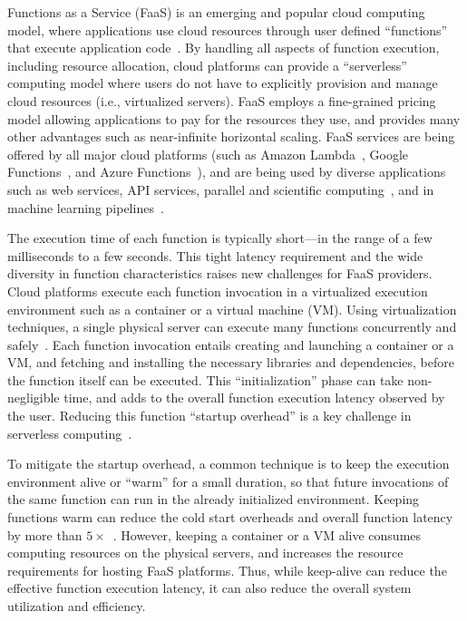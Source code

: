 
Functions as a Service (FaaS) is an emerging and popular cloud computing model, where applications use cloud resources through user defined ``functions'' that execute application code~\cite{jonas2017occupy,jonas_cloud_2019,van_eyk_spec_2017}.
By handling all aspects of function execution, including resource allocation, cloud platforms can  provide a ``serverless'' computing model where users do not have to explicitly provision and manage cloud resources (i.e., virtualized servers).
FaaS employs a fine-grained pricing model allowing applications to pay for the resources they use, and provides many other advantages such as near-infinite horizontal scaling. 
FaaS services are being offered by all major cloud platforms (such as Amazon Lambda~\cite{aws-lambda}, Google Functions~\cite{google-functions}, and Azure Functions~\cite{azure-functions}), and are being used by diverse applications such as web services, API services,  parallel and scientific computing~\cite{funcx_hpdc_20,john_sweep_2019,fouladi_laptop_2019}, and in machine learning pipelines~\cite{carreira2018case, carreira_cirrus_2019}. 


The execution time of each function is typically short---in the range of a few milliseconds to a few seconds.
This tight latency requirement and the wide diversity in function characteristics raises new challenges for FaaS providers. 
Cloud platforms execute each function invocation in a virtualized execution environment such as a container or a virtual machine (VM). %
Using virtualization techniques, a single physical server can execute many functions concurrently and safely~\cite{wang2018peeking}. 
Each function invocation entails creating and launching a container or a VM, and fetching and installing the necessary libraries and dependencies, before the function itself can be executed.
This ``initialization'' phase can take non-negligible time, and adds to the overall function execution latency observed by the user. 
Reducing this function ``startup overhead'' is a key challenge in serverless computing~\cite{oakes_sock_2018, hendrickson2016serverless, warm1, warm2}. 


To mitigate the startup overhead, a common technique is to keep the execution environment alive or ``warm'' for a small duration, so that future invocations of the same function can run in the already initialized environment. 
Keeping functions warm can reduce the cold start overheads and overall function latency by more than  $5\times$~\cite{manner_cold_2018}.  
However, keeping a container or a VM alive consumes computing resources on the physical servers, and increases the resource requirements for hosting FaaS platforms. 
Thus, while keep-alive can reduce the effective function execution latency, it can also reduce the overall system utilization and efficiency.



